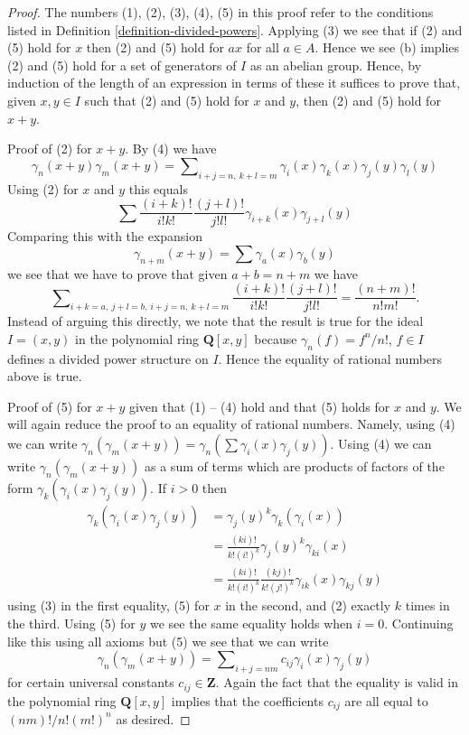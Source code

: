 \begin{proof}
The numbers (1), (2), (3), (4), (5) in this proof refer to the
conditions listed in Definition \ref{definition-divided-powers}.
Applying (3) we see that if (2) and (5) hold for $x$ then (2) and (5)
hold for $ax$ for all $a \in A$. Hence we see (b) implies
(2) and (5) hold for a set of generators
of $I$ as an abelian group. Hence, by induction of the length
of an expression in terms of these it suffices to prove that, given
$x, y \in I$ such that (2) and (5) hold for $x$ and $y$, then (2) and (5) hold
for $x + y$.

\medskip\noindent
Proof of (2) for $x + y$. By (4) we have
$$
\gamma_n(x + y)\gamma_m(x + y) =
\sum\nolimits_{i + j = n,\ k + l = m}
\gamma_i(x)\gamma_k(x)\gamma_j(y)\gamma_l(y)
$$
Using (2) for $x$ and $y$ this equals
$$
\sum \frac{(i + k)!}{i!k!}\frac{(j + l)!}{j!l!}
\gamma_{i + k}(x)\gamma_{j + l}(y)
$$
Comparing this with the expansion
$$
\gamma_{n + m}(x + y) = \sum \gamma_a(x)\gamma_b(y)
$$
we see that we have to prove that given $a + b = n + m$ we have
$$
\sum\nolimits_{i + k = a,\ j + l = b,\ i + j = n,\ k + l = m}
\frac{(i + k)!}{i!k!}\frac{(j + l)!}{j!l!}
=
\frac{(n + m)!}{n!m!}.
$$
Instead of arguing this directly, we note that the result is true
for the ideal $I = (x, y)$ in the polynomial ring $\mathbf{Q}[x, y]$
because $\gamma_n(f) = f^n/n!$, $f \in I$ defines a divided power
structure on $I$. Hence the equality of rational numbers above is true.

\medskip\noindent
Proof of (5) for $x + y$ given that (1) -- (4) hold and that (5)
holds for $x$ and $y$. We will again reduce the proof to an equality
of rational numbers. Namely, using (4) we can write
$\gamma_n(\gamma_m(x + y)) = \gamma_n(\sum \gamma_i(x)\gamma_j(y))$.
Using (4) we can write
$\gamma_n(\gamma_m(x + y))$ as a sum of terms which are products of
factors of the form $\gamma_k(\gamma_i(x)\gamma_j(y))$.
If $i > 0$ then
\begin{align*}
\gamma_k(\gamma_i(x)\gamma_j(y)) & =
\gamma_j(y)^k\gamma_k(\gamma_i(x)) \\
& = \frac{(ki)!}{k!(i!)^k} \gamma_j(y)^k \gamma_{ki}(x) \\
& =
\frac{(ki)!}{k!(i!)^k} \frac{(kj)!}{k!(j!)^k} \gamma_{ik}(x) \gamma_{kj}(y)
\end{align*}
using (3) in the first equality, (5) for $x$ in the second, and
(2) exactly $k$ times in the third. Using (5) for $y$ we see the
same equality holds when $i = 0$. Continuing like this using all
axioms but (5) we see that we can write
$$
\gamma_n(\gamma_m(x + y)) =
\sum\nolimits_{i + j = nm} c_{ij}\gamma_i(x)\gamma_j(y)
$$
for certain universal constants $c_{ij} \in \mathbf{Z}$. Again the fact
that the equality is valid in the polynomial ring $\mathbf{Q}[x, y]$
implies that the coefficients $c_{ij}$ are all equal to $(nm)!/n!(m!)^n$
as desired.
\end{proof}

